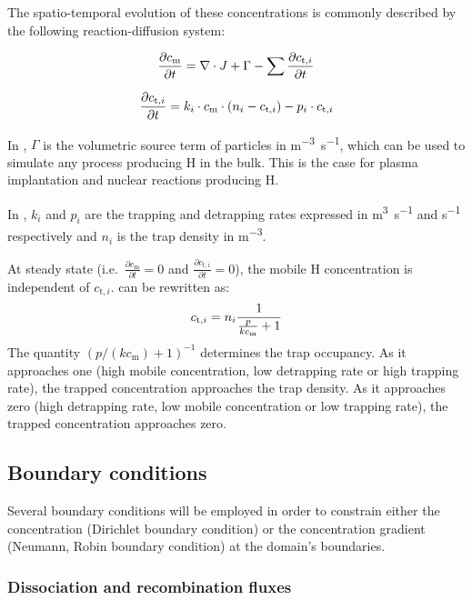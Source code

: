 The spatio-temporal evolution of these concentrations is commonly described by the following reaction-diffusion system:

\begin{equation}
    \frac{\partial c_\mathrm{m}}{\partial t}=\nabla \cdot J+\Gamma-\sum \frac{\partial c_{\mathrm{t}, i}}{\partial t}
    \labeq{mobile}
\end{equation}

\begin{equation}
    \frac{\partial c_{\mathrm{t}, i}}{\partial t}=k_i \cdot c_\mathrm{m} \cdot\left(n_{i}-c_{\mathrm{t}, i}\right)-p_i \cdot c_{\mathrm{t}, i}
    \labeq{trapped}
\end{equation}

In , $\Gamma$ is the volumetric source term of particles in \si{m^{-3}.s^{-1}}, which can be used to simulate any process producing H in the bulk.
This is the case for plasma implantation and nuclear reactions producing H.

In , $k_i$ and $p_i$ are the trapping and detrapping rates expressed in \si{m^3.s^{-1}} and \si{s^{-1}} respectively and $n_i$ is the trap density in \si{m^{-3}}.

At steady state (i.e.\ $\frac{\partial c_\mathrm{m}}{\partial t} = 0$ and $\frac{\partial c_{\mathrm{t}, i}}{\partial t} = 0$), the mobile H concentration is independent of $c_{\mathrm{t}, i}$.
 can be rewritten as:
\begin{equation}
    c_{\mathrm{t}, i} = n_i \frac{1}{\frac{p}{k c_\mathrm{m}} + 1}
    \labeq{steady state ct}
\end{equation}
The quantity $(p / (k c_\mathrm{m}) + 1)^{-1}$ determines the trap occupancy. 
As it approaches one (high mobile concentration, low detrapping rate or high trapping rate), the trapped concentration approaches the trap density.
As it approaches zero (high detrapping rate, low mobile concentration or low trapping rate), the trapped concentration approaches zero.

\subsection{Boundary conditions}

Several boundary conditions will be employed in order to constrain either the concentration (Dirichlet boundary condition) or the concentration gradient (Neumann, Robin boundary condition) at the domain's boundaries.

\subsubsection{Dissociation and recombination fluxes}

